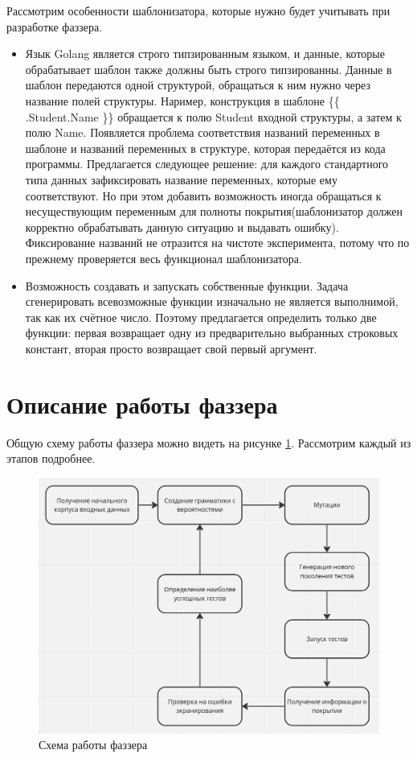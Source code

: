 \documentclass[a4paper]{article}
\begin{document}
Рассмотрим особенности шаблонизатора, которые нужно будет учитывать при разработке фаззера.

\begin{itemize}
    \item Язык Golang является строго типзированным языком, и данные, которые обрабатывает шаблон также должны быть строго типзированны. Данные в шаблон передаются одной структурой, обращаться к ним нужно через название полей структуры. Наример, конструкция в шаблоне \{\{ .Student.Name \}\} обращается к полю Student входной структуры, а затем к полю Name. Появляется проблема соответствия названий переменных в шаблоне и названий переменных в структуре, которая передаётся из кода программы. Предлагается следующее решение: для каждого стандартного типа данных зафиксировать название переменных, которые ему соответствуют. Но при этом добавить возможность иногда обращаться к несуществующим переменным для полноты покрытия(шаблонизатор должен корректно обрабатывать данную ситуацию и выдавать ошибку). Фиксирование названий не отразится на чистоте эксперимента, потому что по прежнему проверяется весь функционал шаблонизатора.
    \item Возможность создавать и запускать собственные функции. Задача сгенерировать всевозможные функции изначально не является выполнимой, так как их счётное число. Поэтому предлагается определить только две функции: первая возвращает одну из предварительно выбранных строковых констант, вторая просто возвращает свой первый аргумент. 
\end{itemize}

\newpage
\section{Описание работы фаззера}
\indent

Общую схему работы фаззера можно видеть на рисунке \ref{FuzzerArch}. Рассмотрим каждый из этапов подробнее.
\begin{figure}[ht!]
    \includegraphics[width=180mm]{FuzzerArch.png}
    \caption{Схема работы фаззера}
    \label{FuzzerArch}
    \end{figure}
\end{document}
